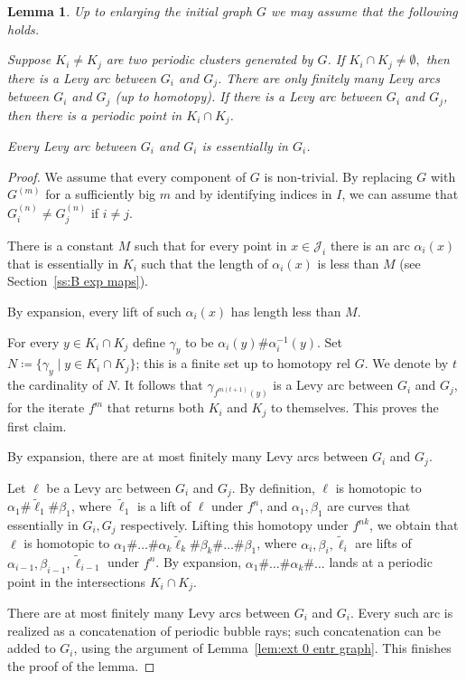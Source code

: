 \documentclass{amsart}
\theoremstyle{plain}
\newtheorem{lemma}[theorem]{Lemma}
\theoremstyle{definition}
\theoremstyle{remark}
\newcommand{\reminder}[1]{\textsl{$\lhd\rhd$#1$\lhd\rhd$}\marginpar{$\lhd\rhd\lhd\rhd\lhd\rhd$}}%
\newcommand{\hide}[1]{}
\newcommand{\Jul}{{\mathcal J}}
\begin{document}
\begin{lemma}\label{lem: levy arcs between clusters}
Up to enlarging the initial graph $G$ we may assume that the following holds. 

Suppose $K_i\not=K_j$ are two periodic clusters generated by $G$.  If $K_i\cap K_j\not=\emptyset,$ then there is a Levy arc between $G_i$ and $G_j$. There are only finitely many Levy arcs between $G_i$ and $G_j$ (up to homotopy).  If there is a Levy arc between $G_i$ and $G_j$, then there is a periodic point in $K_i\cap K_j$.

Every Levy arc between $G_i$ and $G_i$ is essentially in $G_i$. 
\end{lemma}
\begin{proof}  We assume that every component of $G$ is non-trivial. By replacing $G$ with $G^{(m)}$ for a sufficiently big $m$ and by identifying indices in $I$, we can assume that $G_i^{(n)}\not= G_j^{(n)}$ if $i\not= j$.

There is a constant $M$ such that for every point in $x\in \Jul_i$ there is an arc $\alpha_i(x)$ that is essentially in $K_i$ such that the length of $\alpha_i(x)$ is less than $M$ (see Section~\ref{ss:B exp maps}). 
 
By expansion, every lift of such $\alpha_i(x)$ has length less than $M$. 

For every $y\in K_i\cap K_j$ define $\gamma_y$ to be  $\alpha_i(y)\# \alpha^{-1}_i(y)$. Set $N\coloneq \{\gamma_y\mid y\in K_i\cap K_j\}$; this is a finite set up to homotopy rel $G$. We denote by $t$ the cardinality of $N$. It follows that $\gamma_{f^{m(t+1)}(y)}$ is a Levy arc between $G_i$ and $G_j$,  for the iterate $f^m$ that returns both $K_i$ and $K_j$ to themselves. This proves the first claim. 

By expansion, there are at most finitely many Levy arcs between $G_i$ and $G_j$. 


Let $\ell$ be a Levy arc between $G_i$ and $G_j$. By definition, $\ell$ is homotopic to $\alpha_1\# \tilde \ell_1\#\beta_1$, where $\tilde \ell_1$ is a lift of $\ell$ under $f^n$, and $\alpha_1, \beta_1$ are curves that essentially in $G_i,G_j$ respectively. Lifting this homotopy under $f^{nk}$, we obtain that $\ell$ is homotopic to $\alpha_1\#\dots\#\alpha_k \tilde \ell_k \#\beta_k \#\dots  \#  \beta_1$, where $\alpha_i, \beta_i,\tilde \ell _i$ are lifts of   $\alpha_{i-1}, \beta_{i-1},\tilde \ell _{i-1}$ under $f^n$. By expansion, $\alpha_1\#\dots\#\alpha_k\#\dots$ lands at a periodic point in the intersections $K_i\cap K_j$.



There are at most finitely many Levy arcs between $G_i$ and $G_i$. Every such arc is realized as a concatenation of periodic bubble rays; such concatenation can be added to $G_i$, using the argument of Lemma~\ref{lem:ext 0 entr graph}. This finishes the proof of the lemma.
 \end{proof}
\end{document}
